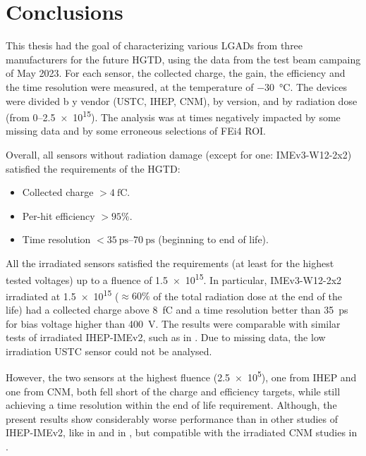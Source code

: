 \chapter*{Conclusions}\label{chap:conclusion}


This thesis had the goal of characterizing various LGADs from three manufacturers for the future HGTD, using the data from the test beam campaing of May 2023. For each sensor, the collected charge, the gain, the efficiency and the time resolution were measured, at the temperature of \qty{-30}{\degreeCelsius}. The devices were divided b y vendor (USTC, IHEP, CNM), by version, and by radiation dose (from \qtyrange{0}{2.5e15}{\neutroneq}). The analysis was at times negatively impacted by some missing data and by some erroneous selections of FEi4 ROI.

Overall, all sensors without radiation damage (except for one: IMEv3-W12-2x2) satisfied the requirements of the HGTD:
\begin{itemize}
    \item Collected charge \(>\qty{4}{\femto\coulomb}\).
    \item Per-hit efficiency \(>95\%\).
    \item Time resolution \(<\qtyrange{35}{70}{\pico\second}\) (beginning to end of life).
\end{itemize}

All the irradiated sensors satisfied the requirements (at least for the highest tested voltages) up to a fluence of \qty{1.5e15}{\neutroneq}. In particular, IMEv3-W12-2x2 irradiated at \qty{1.5e15}{\neutroneq} (\(\approx60\%\) of the total radiation dose at the end of the life) had a collected charge above \qty{8}{\femto\coulomb} and a time resolution better than \qty{35}{\pico\second} for bias voltage higher than \qty{400}{\volt}. The results were comparable with similar tests of irradiated IHEP-IMEv2, such as in \cite{Ali:2023roa}. Due to missing data, the low irradiation USTC sensor could not be analysed.

However, the two sensors at the highest fluence (\qty{2.5e5}{\neutroneq}), one from IHEP and one from CNM, both fell short of the charge and efficiency targets, while still achieving a time resolution within the end of life requirement. Although, the present results show considerably worse performance than in other studies of IHEP-IMEv2, like in \cite{Ali:2023roa} and in \cite{Wu:2022ruu}, but compatible with the irradiated CNM studies in \cite{Agapopoulou_2022}. 

